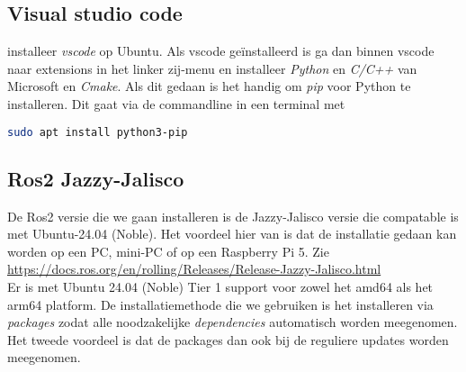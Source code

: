 \documentclass[12pt,a4paper]{exam}
\begin{document}
\subsection{Visual studio code}
installeer \textit{vscode} op Ubuntu. Als vscode ge\"installeerd is ga dan binnen vscode naar extensions in het linker zij-menu en installeer \textit{Python} en \textit{C/C++} van Microsoft en \textit{Cmake}. Als dit gedaan is het handig om \textit{pip} voor Python te installeren. Dit gaat via de commandline in een terminal met
\begin{lstlisting}[language=bash]
sudo apt install python3-pip
\end{lstlisting}

%
% 
% 
% 
%


\subsection{Ros2 Jazzy-Jalisco}
De Ros2 versie die we gaan installeren is de Jazzy-Jalisco versie die compatable is met Ubuntu-24.04 (Noble). Het voordeel hier van is dat de installatie gedaan kan worden op een PC, mini-PC of op een Raspberry Pi 5. Zie\\\noindent 
{\small \url{https://docs.ros.org/en/rolling/Releases/Release-Jazzy-Jalisco.html}}\\\noindent
Er is met Ubuntu 24.04 (Noble) Tier 1 support voor zowel het amd64 als het arm64 platform. De installatiemethode die we gebruiken is het installeren via \textit{packages} zodat alle noodzakelijke \textit{dependencies} automatisch worden meegenomen. Het tweede voordeel is dat de packages dan ook bij de reguliere updates worden meegenomen. 
\end{document}
